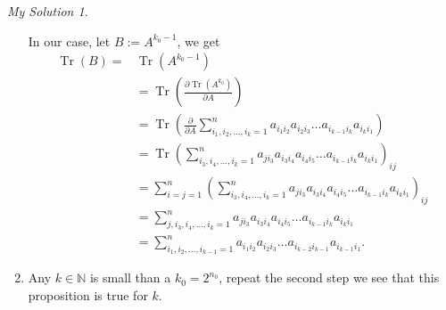 \documentclass[]{article}
\theoremstyle{remark}
\newtheorem*{sol}{My Solution}
\begin{document}
\begin{sol}
\begin{enumerate}
		In our case, let $ B:=A^{k_0 -1} $, we get
		\begin{align*}
			\operatorname{Tr}(B) = & \operatorname{Tr}(A^{k_0 -1})\\
			&=\operatorname{Tr}\left( \frac{\partial\operatorname{Tr}(A^{k_0})}{\partial A } \right)\\
			&=\operatorname{Tr}\left( \frac{\partial}{\partial A } \sum_{i_{1}, i_{2}, \ldots, i_{k}=1}^{n} a_{i_{1} i_{2}} a_{i_{2} i_{3}} \ldots a_{i_{k-1} i_{k}} a_{i_{k} i_{1}}\right)\\
			&=\operatorname{Tr} \left( \sum_{i_{3}, i_{4}, \ldots, i_{k}=1}^{n} a_{j i_3}a_{i_{3} i_{4}} a_{i_{4} i_{5}} \ldots a_{i_{k-1} i_{k}} a_{i_{k} i_{1}}\right) _{ij}\\
			&= \sum_{i=j=1}^{n}\left( \sum_{i_{3}, i_{4}, \ldots, i_{k}=1}^{n} a_{j i_3}a_{i_{3} i_{4}} a_{i_{4} i_{5}} \ldots a_{i_{k-1} i_{k}} a_{i_{k} i_{1}}\right) _{ij}\\
			&=\sum_{j,i_{3}, i_{4}, \ldots, i_{k}=1}^{n} a_{j i_3}a_{i_{3} i_{4}} a_{i_{4} i_{5}} \ldots a_{i_{k-1} i_{k}} a_{i_{k} i_{1}}\\
			&= \sum_{i_{1}, i_{2}, \ldots, i_{k-1}=1}^{n} a_{i_{1} i_{2}} a_{i_{2} i_{3}} \ldots a_{i_{k-2} i_{k-1}} a_{i_{k-1} i_{1}}.
		\end{align*}
		\item Any $ k\in \mathbb{N} $ is small than a $ k_0 = 2^{n_0} $, repeat the second step we see that this proposition is true for $ k $.
	\end{enumerate}
\end{sol}
\end{document}
